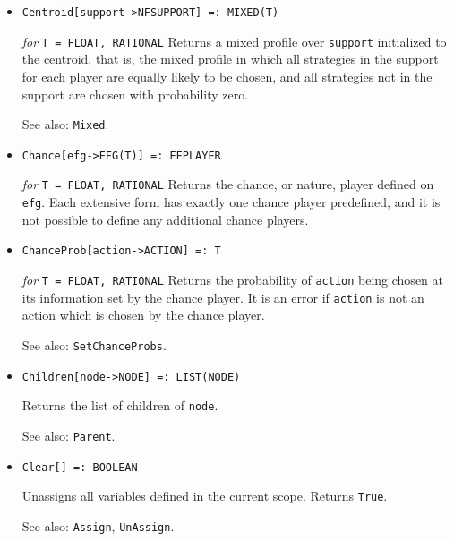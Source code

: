 \begin{itemize}
\item{}
\protect \large \begin{verbatim}
Centroid[support->NFSUPPORT] =: MIXED(T)
\end{verbatim}\normalsize

{\it for} {\tt T = FLOAT, RATIONAL}
\bd
Returns a mixed profile over \verb+support+
initialized to the centroid, that is, the mixed profile in which 
all strategies in the support for each player are equally likely to be
chosen, and all strategies not in the support are chosen with probability
zero.
\item [See also:] \verb+Mixed+.
\ed

\item{}
\protect \large \begin{verbatim}
Chance[efg->EFG(T)] =: EFPLAYER
\end{verbatim}\normalsize

{\it for} {\tt T = FLOAT, RATIONAL}
\bd
Returns the chance, or nature, player defined on \verb+efg+.
Each extensive form has exactly one
chance player predefined, and it is not possible to define any additional
chance players.
\ed

\item{}
\protect \large \begin{verbatim}
ChanceProb[action->ACTION] =: T
\end{verbatim}\normalsize

{\it for} {\tt T = FLOAT, RATIONAL}
\bd
Returns the probability of \verb+action+ being chosen at its information
set by the chance player.  It is an error if \verb+action+ is not an action
which is chosen by the chance player.
\item [See also:] \verb+SetChanceProbs+.
\ed

\item{}
\protect \large \begin{verbatim} 
Children[node->NODE] =: LIST(NODE)
\end{verbatim}\normalsize

\bd
Returns the list of children of \verb+node+.
\item [See also:] \verb+Parent+.
\ed

\item{}
\protect \large \begin{verbatim}
Clear[] =: BOOLEAN
\end{verbatim}\normalsize

\bd
Unassigns all variables defined in the current scope.  Returns \verb+True+.
\item [See also:] \verb+Assign+, \verb+UnAssign+.
\ed


\end{itemize}
